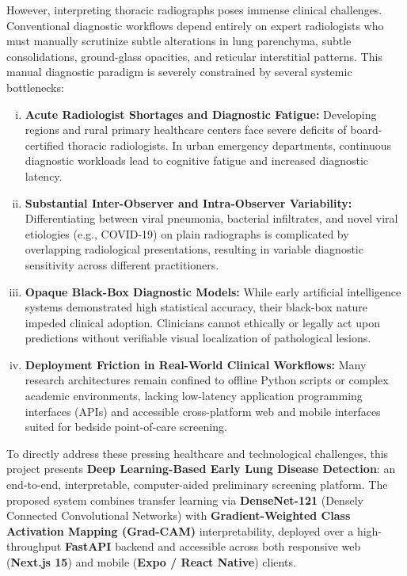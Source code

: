 \documentclass[12pt,a4paper]{report}
\begin{document}
However, interpreting thoracic radiographs poses immense clinical challenges. Conventional diagnostic workflows depend entirely on expert radiologists who must manually scrutinize subtle alterations in lung parenchyma, subtle consolidations, ground-glass opacities, and reticular interstitial patterns. This manual diagnostic paradigm is severely constrained by several systemic bottlenecks:
\begin{enumerate}[(i)]
    \item \textbf{Acute Radiologist Shortages and Diagnostic Fatigue:} Developing regions and rural primary healthcare centers face severe deficits of board-certified thoracic radiologists. In urban emergency departments, continuous diagnostic workloads lead to cognitive fatigue and increased diagnostic latency.
    \item \textbf{Substantial Inter-Observer and Intra-Observer Variability:} Differentiating between viral pneumonia, bacterial infiltrates, and novel viral etiologies (e.g., COVID-19) on plain radiographs is complicated by overlapping radiological presentations, resulting in variable diagnostic sensitivity across different practitioners.
    \item \textbf{Opaque Black-Box Diagnostic Models:} While early artificial intelligence systems demonstrated high statistical accuracy, their black-box nature impeded clinical adoption. Clinicians cannot ethically or legally act upon predictions without verifiable visual localization of pathological lesions.
    \item \textbf{Deployment Friction in Real-World Clinical Workflows:} Many research architectures remain confined to offline Python scripts or complex academic environments, lacking low-latency application programming interfaces (APIs) and accessible cross-platform web and mobile interfaces suited for bedside point-of-care screening.
\end{enumerate}

To directly address these pressing healthcare and technological challenges, this project presents \textbf{Deep Learning-Based Early Lung Disease Detection}: an end-to-end, interpretable, computer-aided preliminary screening platform. The proposed system combines transfer learning via \textbf{DenseNet-121} (Densely Connected Convolutional Networks) with \textbf{Gradient-Weighted Class Activation Mapping (Grad-CAM)} interpretability, deployed over a high-throughput \textbf{FastAPI} backend and accessible across both responsive web (\textbf{Next.js 15}) and mobile (\textbf{Expo / React Native}) clients.
\end{document}
